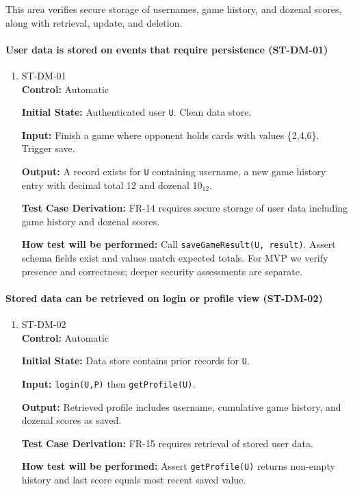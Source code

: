 \documentclass[12pt, titlepage]{article}
\begin{document}
This area verifies secure storage of usernames, game history, and dozenal scores, along with retrieval, update, and deletion.

\paragraph{User data is stored on events that require persistence (ST-DM-01)}
\begin{enumerate}
\item{ST-DM-01\\}
\textbf{Control:} Automatic

\textbf{Initial State:} Authenticated user \texttt{U}. Clean data store.

\textbf{Input:} Finish a game where opponent holds cards with values \{2,4,6\}. Trigger save.

\textbf{Output:} A record exists for \texttt{U} containing username, a new game history entry with decimal total 12 and dozenal 10$_{12}$.

\textbf{Test Case Derivation:} FR-14 requires secure storage of user data including game history and dozenal scores.

\textbf{How test will be performed:} Call \texttt{saveGameResult(U, result)}. Assert schema fields exist and values match expected totals. For MVP we verify presence and correctness; deeper security assessments are separate.
\end{enumerate}

\paragraph{Stored data can be retrieved on login or profile view (ST-DM-02)}
\begin{enumerate}
\item{ST-DM-02\\}
\textbf{Control:} Automatic

\textbf{Initial State:} Data store contains prior records for \texttt{U}.

\textbf{Input:} \texttt{login(U,P)} then \texttt{getProfile(U)}.

\textbf{Output:} Retrieved profile includes username, cumulative game history, and dozenal scores as saved.

\textbf{Test Case Derivation:} FR-15 requires retrieval of stored user data.

\textbf{How test will be performed:} Assert \texttt{getProfile(U)} returns non-empty history and last score equals most recent saved value.
\end{enumerate}
\end{document}
